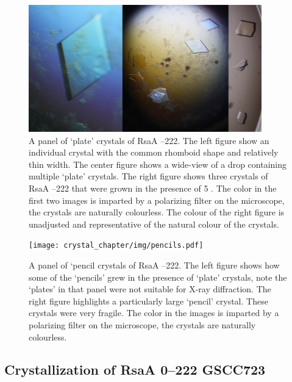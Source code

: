 \begin{figure}[htb]
  	\begin{center}
   		\includegraphics[width=0.9\textwidth]{crystal_chapter/img/goodxtal.jpg}
   	\end{center}
   	\caption[Panel of well diffracting `plate' crystals of RsaA --222]{A panel of `plate' crystals of RsaA --222. The left figure show an individual crystal with the common rhomboid shape and relatively thin width. The center figure shows a wide-view of a drop containing multiple `plate' crystals. The right figure shows three crystals of RsaA --222 that were grown in the presence of 5 \millimolar{} . The color in the first two images is imparted by a polarizing filter on the microscope, the crystals are naturally colourless. The colour of the right figure is unadjusted and representative of the natural colour of the crystals.}
   	\label{fig:crystal-panel}
\end{figure}   
\begin{figure}[htb]
  	\begin{center}
   		\texttt{[image: crystal\_chapter/img/pencils.pdf]}
   	\end{center}
   	\caption[A panel of `pencil crystals of RsaA --222']{A panel of `pencil crystals of RsaA --222. The left figure shows how some of the `pencils' grew in the presence of `plate' crystals, note the `plates' in that panel were not suitable for X-ray diffraction. The right figure highlights a particularly large `pencil' crystal. These crystals were very fragile.  The color in the images is imparted by a polarizing filter on the microscope, the crystals are naturally colourless.} 
   	\label{fig:pencils}
\end{figure}   

\subsection{Crystallization of RsaA \del{}0--222 GSCC723} \label{sec:cryst-rsaa-del0}

